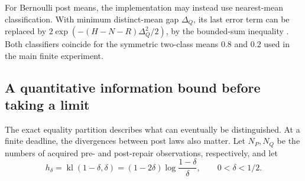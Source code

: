 For Bernoulli post means, the implementation may instead use nearest-mean
classification. With minimum distinct-mean gap $\Delta_Q$, its last error
term can be replaced by
$2\exp(-(H-N-R)\Delta_Q^2/2)$, by the bounded-sum inequality
\citep{hoeffding1963}. Both classifiers coincide for the symmetric two-class
means $0.8$ and $0.2$ used in the main finite experiment.

\subsection{A quantitative information bound before taking a limit}
The exact equality partition describes what can eventually be distinguished.
At a finite deadline, the divergences between post laws also matter.
Let $N_P,N_Q$ be the numbers of acquired pre- and post-repair observations,
respectively, and let
\[
h_\delta=\operatorname{kl}(1-\delta,\delta)
=(1-2\delta)\log\frac{1-\delta}{\delta},
\qquad 0<\delta<1/2.
\]

